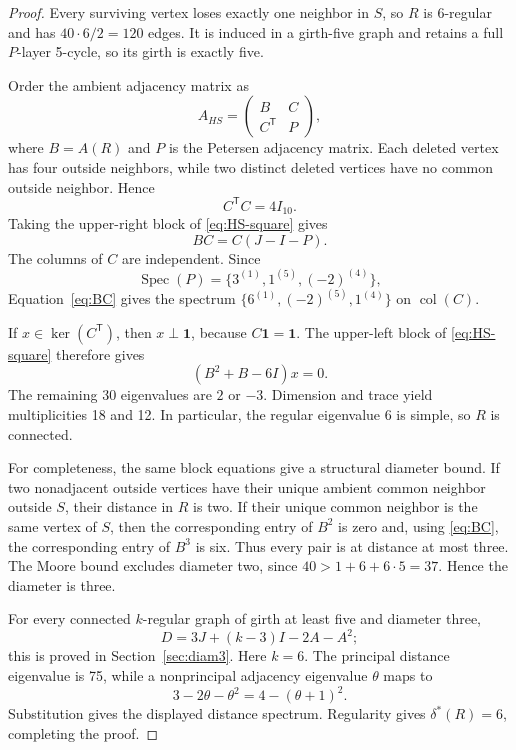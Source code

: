 \documentclass[11pt,reqno]{amsart}
\newcommand{\one}{\mathbf 1}
\newcommand{\Spec}{\operatorname{Spec}}
\theoremstyle{plain}
\theoremstyle{definition}
\theoremstyle{remark}
\begin{document}
\begin{proof}
Every surviving vertex loses exactly one neighbor in $S$, so $R$ is
6-regular and has $40\cdot6/2=120$ edges.  It is induced in a girth-five
graph and retains a full $P$-layer 5-cycle, so its girth is exactly five.

Order the ambient adjacency matrix as
\[
 A_{HS}=\begin{pmatrix}B&C\\C^{\mathsf T}&P\end{pmatrix},
\]
where $B=A(R)$ and $P$ is the Petersen adjacency matrix.  Each deleted vertex
has four outside neighbors, while two distinct deleted vertices have no
common outside neighbor.  Hence
\[
 C^{\mathsf T}C=4I_{10}.
\]
Taking the upper-right block of \eqref{eq:HS-square} gives
\begin{equation}\label{eq:BC}
 BC=C(J-I-P).
\end{equation}
The columns of $C$ are independent.  Since
\[
 \Spec(P)=\{3^{(1)},1^{(5)},(-2)^{(4)}\},
\]
Equation~\eqref{eq:BC} gives the spectrum
$\{6^{(1)},(-2)^{(5)},1^{(4)}\}$ on $\operatorname{col}(C)$.

If $x\in\ker(C^{\mathsf T})$, then $x\perp\one$, because
$C\one=\one$.  The upper-left block of \eqref{eq:HS-square} therefore gives
\[
 (B^2+B-6I)x=0.
\]
The remaining 30 eigenvalues are $2$ or $-3$.  Dimension and trace yield
multiplicities 18 and 12.  In particular, the regular eigenvalue 6 is simple,
so $R$ is connected.

For completeness, the same block equations give a structural diameter bound.
If two nonadjacent outside vertices have their unique ambient common neighbor
outside $S$, their distance in $R$ is two.  If their unique common neighbor is
the same vertex of $S$, then the corresponding entry of $B^2$ is zero and,
using \eqref{eq:BC}, the corresponding entry of $B^3$ is six.  Thus every
pair is at distance at most three.  The Moore bound excludes diameter two,
since $40>1+6+6\cdot5=37$.  Hence the diameter is three.

For every connected $k$-regular graph of girth at least five and diameter
three,
\begin{equation}\label{eq:diam3-polynomial}
 D=3J+(k-3)I-2A-A^2;
\end{equation}
this is proved in Section~\ref{sec:diam3}.  Here $k=6$.  The principal
distance eigenvalue is 75, while a nonprincipal adjacency eigenvalue $\theta$
maps to
\[
 3-2\theta-\theta^2=4-(\theta+1)^2.
\]
Substitution gives the displayed distance spectrum.  Regularity gives
$\delta^*(R)=6$, completing the proof.
\end{proof}
\end{document}
